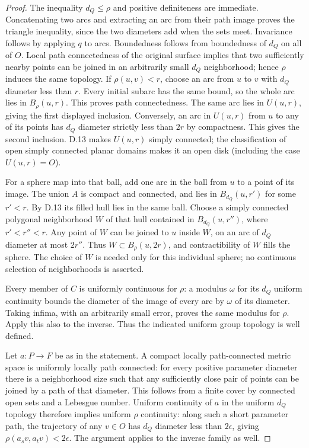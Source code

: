 \begin{proof}
The inequality $d_Q\leq\rho$ and positive definiteness are immediate.
Concatenating two arcs and extracting an arc from their path image
proves the triangle inequality, since the two diameters add when
the sets meet.  Invariance follows by applying $q$ to arcs.
Boundedness follows from boundedness of $d_Q$ on all of $O$.
Local path connectedness of the original surface implies that
two sufficiently nearby points can be joined in an arbitrarily
small $d_Q$ neighborhood; hence $\rho$ induces the same topology.
If $\rho(u,v)<r$, choose an arc from $u$ to $v$ with $d_Q$ diameter
less than $r$.  Every initial subarc has the same bound, so the
whole arc lies in $B_\rho(u,r)$.  This proves path connectedness.
The same arc lies in $U(u,r)$, giving the first displayed
inclusion.  Conversely, an arc in $U(u,r)$ from $u$ to any of
its points has $d_Q$ diameter strictly less than $2r$ by compactness.
This gives the second inclusion.  D.13 makes $U(u,r)$ simply
connected; the classification of open simply connected planar
domains makes it an open disk (including the case $U(u,r)=O$).

For a sphere map into that ball, add one arc in the ball from
$u$ to a point of its image.  The union $A$ is compact and connected,
and lies in $B_{d_Q}(u,r')$ for some $r'<r$.  By D.13 its filled
hull lies in the same ball.  Choose a simply connected polygonal
neighborhood $W$ of that hull contained in
$B_{d_Q}(u,r'')$, where $r'<r''<r$.  Any point of $W$ can be joined
to $u$ inside $W$, on an arc of $d_Q$ diameter at most $2r''$.
Thus $W\subset B_\rho(u,2r)$, and contractibility of $W$ fills the
sphere.  The choice of $W$ is needed only for this individual
sphere; no continuous selection of neighborhoods is asserted.

Every member of $C$ is uniformly continuous for $\rho$: a modulus
$\omega$ for its $d_Q$ uniform continuity bounds the diameter of
the image of every arc by $\omega$ of its diameter.  Taking infima,
with an arbitrarily small error, proves the same modulus for
$\rho$.  Apply this also to the inverse.  Thus the indicated
uniform group topology is well defined.

Let $a:P\to F$ be as in the statement.  A compact locally
path-connected metric space is uniformly locally path connected:
for every positive parameter diameter there is a neighborhood
size such that any sufficiently close pair of points can be
joined by a path of that diameter.  This follows from a finite
cover by connected open sets and a Lebesgue number.  Uniform
continuity of $a$ in the uniform $d_Q$ topology therefore implies
uniform $\rho$ continuity: along such a short parameter path,
the trajectory of any $v\in O$ has $d_Q$ diameter less than
$2\epsilon$, giving $\rho(a_sv,a_tv)<2\epsilon$.  The argument
applies to the inverse family as well.


\end{proof}

